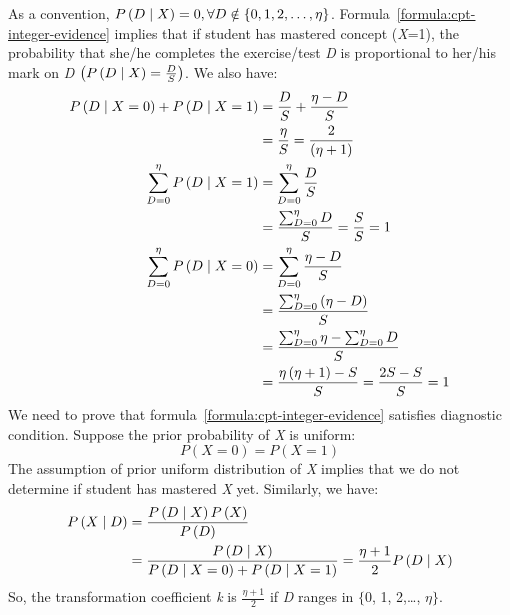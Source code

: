 \documentclass{article}
\numberwithin{equation}{section}
\numberwithin{figure}{section}
\numberwithin{table}{section}
\begin{document}
As a convention, $P\left(D\mathrel{\left|\vphantom{D X}\right.\kern-\nulldelimiterspace}X\right)=0,\forall D\notin \left\{0,1,2,\dots ,\eta \right\}$. Formula~\ref{formula:cpt-integer-evidence} implies that if student has mastered concept (\textit{X}=1), the probability that she/he completes the exercise/test \textit{D} is proportional to her/his mark on \textit{D} $\left(P\left(D\mathrel{\left|\vphantom{D X}\right.\kern-\nulldelimiterspace}X\right)=\frac{D}{S}\right)$. We also have:
\begin{align*}
P\left(D\mathrel{\left|\vphantom{D X=0}\right.\kern-\nulldelimiterspace}X=0\right)+P\left(D\mathrel{\left|\vphantom{D X=1}\right.\kern-\nulldelimiterspace}X=1\right)&=\frac{D}{S}+\frac{\eta -D}{S}\\
&=\frac{\eta }{S}=\frac{2}{\left(\eta +1\right)}\\
\sum^{\eta }_{D=0}{P\left(D\mathrel{\left|\vphantom{D X=1}\right.\kern-\nulldelimiterspace}X=1\right)}&=\sum^{\eta }_{D=0}{\frac{D}{S}}\\
&=\frac{\sum^{\eta }_{D=0}{D}}{S}=\frac{S}{S}=1\\
\sum^{\eta }_{D=0}{P\left(D\mathrel{\left|\vphantom{D X=0}\right.\kern-\nulldelimiterspace}X=0\right)}&=\sum^{\eta }_{D=0}{\frac{\eta -D}{S}}\\
&=\frac{\sum^{\eta }_{D=0}{\left(\eta -D\right)}}{S}\\
&=\frac{\sum^{\eta }_{D=0}{\eta }-\sum^{\eta }_{D=0}{D}}{S}\\
&=\frac{\eta \left(\eta +1\right)-S}{S}=\frac{2S-S}{S}=1
\end{align*}
We need to prove that formula~\ref{formula:cpt-integer-evidence} satisfies diagnostic condition. Suppose the prior probability of \textit{X} is uniform:
\[P\left(X=0\right)=P\left(X=1\right)\] 
The assumption of prior uniform distribution of \textit{X} implies that we do not determine if student has mastered \textit{X} yet. Similarly, we have:
\begin{align*}
P\left(X\mathrel{\left|\vphantom{X D}\right.\kern-\nulldelimiterspace}D\right)&=\frac{P\left(D\mathrel{\left|\vphantom{D X}\right.\kern-\nulldelimiterspace}X\right)P\left(X\right)}{P\left(D\right)}\\
&=\frac{P\left(D\mathrel{\left|\vphantom{D X}\right.\kern-\nulldelimiterspace}X\right)}{P\left(D\mathrel{\left|\vphantom{D X=0}\right.\kern-\nulldelimiterspace}X=0\right)+P\left(D\mathrel{\left|\vphantom{D X=1}\right.\kern-\nulldelimiterspace}X=1\right)}=\frac{\eta +1}{2}P\left(D\mathrel{\left|\vphantom{D X}\right.\kern-\nulldelimiterspace}X\right)
\end{align*}
So, the transformation coefficient \textit{k} is $\frac{\eta +1}{2}$ if \textit{D} ranges in $\{$0, 1, 2,{\dots}, \textit{$\eta$}$\}$.
\end{document}
